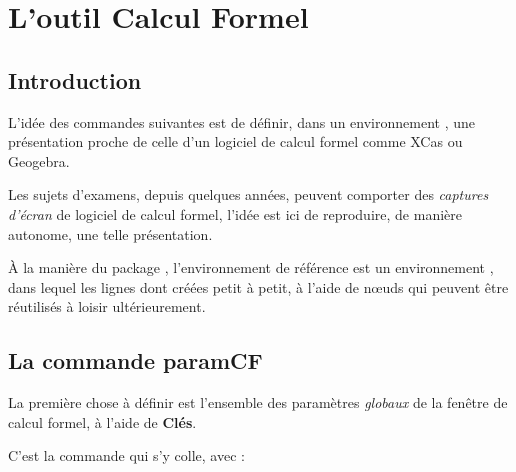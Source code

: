 \documentclass{article}
\newcommand\ctex[1]{\tcbox[vignettelatex]{#1}}
\newcommand\Cle[1]{{\bfseries\sffamily\textlangle #1\textrangle}}
\begin{document}
\newpage

\section{L'outil \og Calcul Formel \fg}

\subsection{Introduction}

L'idée des commandes suivantes est de définir, dans un environnement \TikZ, une présentation proche de celle d'un logiciel de calcul formel comme \textsf{XCas} ou \textsf{Geogebra}.

\smallskip

Les sujets d'examens, depuis quelques années, peuvent comporter des \textit{captures d'écran} de logiciel de calcul formel, l'idée est ici de reproduire, de manière autonome, une telle présentation.

\smallskip

À la manière du \textsf{package} \ctex{tkz-tab}, l'environnement de référence est un environnement \TikZ, dans lequel les lignes dont créées petit à petit, à l'aide de nœuds qui peuvent être réutilisés à loisir ultérieurement.

\subsection{La commande \og paramCF \fg}

La première chose à définir est l'ensemble des paramètres \textit{globaux} de la fenêtre de calcul formel, à l'aide de \Cle{Clés}.

C'est la commande \ctex{\textbackslash paramCF} qui s'y colle, avec :
\end{document}
